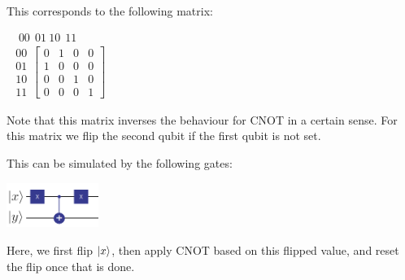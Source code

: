 \documentclass[conference]{IEEEtran}
\begin{document}
\begin{appendices}
This corresponds to the following matrix:

\begin{center}
$
\begin{matrix}
    \ \ \ {\scriptstyle 00} \ \ {\scriptstyle 01} \ {\scriptstyle 10} \ \ {\scriptstyle 11}
    \\
    \begin{matrix}
    {\scriptstyle 00} \\
    {\scriptstyle 01} \\
    {\scriptstyle 10} \\
    {\scriptstyle 11}
    \end{matrix}
    \begin{bmatrix}
    0 & 1 & 0 & 0 \\
    1 & 0 & 0 & 0 \\
    0 & 0 & 1 & 0 \\
    0 & 0 & 0 & 1
    \end{bmatrix}
\end{matrix}
$
\end{center}

Note that this matrix inverses the behaviour for CNOT in a certain sense.
For this matrix we flip the second qubit if the first qubit is not set.

This can be simulated by the following gates:

\centerline{
    \includegraphics[width=0.225\textwidth]{img/oracle_f_for_not_x.png}
}

Here, we first flip $\ket{x}$, then apply CNOT based on this flipped value, and reset the flip once that is done.


\end{appendices}
\end{document}
